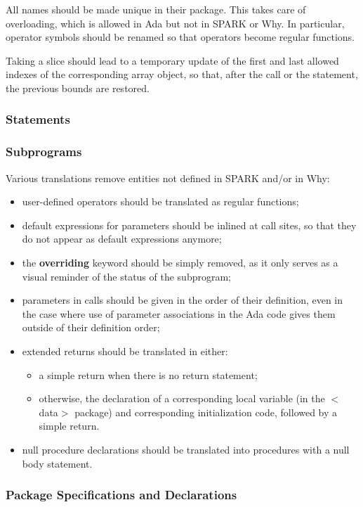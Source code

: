 \documentclass[fullpage]{article}
\newcommand{\kw}[1]{\textbf{#1}}
\begin{document}
All names should be made unique in their package. This takes care of
overloading, which is allowed in Ada but not in SPARK or Why. In particular,
operator symbols should be renamed so that operators become regular functions.

Taking a slice should lead to a temporary update of the first and last allowed
indexes of the corresponding array object, so that, after the call or the
statement, the previous bounds are restored.


\subsubsection{Statements}

\subsubsection{Subprograms}

Various translations remove entities not defined in SPARK and/or in Why:
\begin{itemize}
\item user-defined operators should be translated as regular functions;
\item default expressions for parameters should be inlined at call sites, so
  that they do not appear as default expressions anymore;
\item the \kw{overriding} keyword should be simply removed, as it only serves
  as a visual reminder of the status of the subprogram;
\item parameters in calls should be given in the order of their definition,
  even in the case where use of parameter associations in the Ada code gives
  them outside of their definition order;
\item extended returns should be translated in either:
  \begin{itemize}
  \item a simple return when there is no return statement;
  \item otherwise, the declaration of a corresponding local variable (in the
    $<$data$>$ package) and corresponding initialization code, followed by a
    simple return.
  \end{itemize}
\item null procedure declarations should be translated into procedures with a
  null body statement.
\end{itemize}

\subsubsection{Package Specifications and Declarations}
\end{document}
